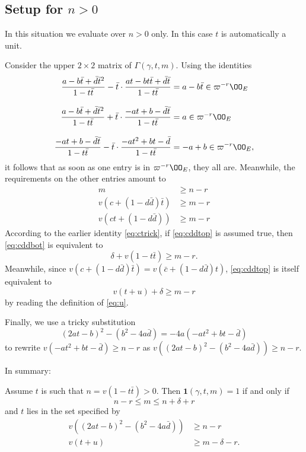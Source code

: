 \subsection{Setup for $n > 0$}
In this situation we evaluate over $n > 0$ only.
In this case $t$ is automatically a unit.

Consider the upper $2 \times 2$ matrix of $\Gamma(\gamma, t, m)$.
Using the identities
\begin{align*}
  \dfrac{a-b\bar t+\bar d \bar t^2}{1-t \bar t}
    - \bar t \cdot \dfrac{at-bt\bar t+\bar d \bar t}{1-t \bar t}
    &= a-b\bar t \in \varpi^{-r} \OO_E \\[2ex]
  \dfrac{a-b\bar t+\bar d \bar t^2}{1-t \bar t}
    + \bar t \cdot \dfrac{-at+b-\bar d \bar t}{1-t \bar t}
    &= a \in \varpi^{-r} \OO_E \\[2ex]
  \dfrac{-at+b-\bar d \bar t}{1-t \bar t}
    - \bar t \cdot \dfrac{-at^2+bt-\bar d}{1-t \bar t}
    &= -a+b \in \varpi^{-r} \OO_E,
\end{align*}
it follows that as soon as one entry is in $\varpi^{-r} \OO_E$, they all are.
Meanwhile, the requirements on the other entries amount to
\begin{align}
  m & \geq n - r \\
  v\left( c+(1-d \bar d) \bar t \right) &\geq m-r \label{eq:cddtop} \\
  v\left( ct+(1-d \bar d) \right) &\geq m-r \label{eq:cddbot}
\end{align}
According to the earlier identity \eqref{eq:ctrick},
if \eqref{eq:cddtop} is assumed true,
then \eqref{eq:cddbot} is equivalent to
\[ \delta + v(1-t \bar t) \ge m-r. \]
Meanwhile, since $v(c+(1-d \bar d) \bar t) = v(\bar c + (1-d \bar d)t)$,
\eqref{eq:cddtop} is itself equivalent to
\[ v(t+u) + \delta \geq m-r \]
by reading the definition of \eqref{eq:u}.

Finally, we use a tricky substitution
\[ (2at-b)^2 - (b^2-4a\bar d) = -4a(-at^2+bt-\bar d) \]
to rewrite $v(-at^2+bt-\bar d) \geq n-r$
as $v\left( (2at-b)^2 - (b^2-4a\bar d) \right) \geq n-r$.

In summary:
\begin{claim}
  Assume $t$ is such that $n = v(1-t \bar t) > 0$.
  Then $\mathbf{1}(\gamma, t, m) = 1$ if and only if
  \[ n - r \leq m \leq n + \delta + r \]
  and $t$ lies in the set specified by
  \begin{align*}
    v\left( (2at-b)^2 - (b^2-4a\bar d) \right) &\geq n-r \\
    v(t+u) &\ge m-\delta-r.
  \end{align*}
\end{claim}

